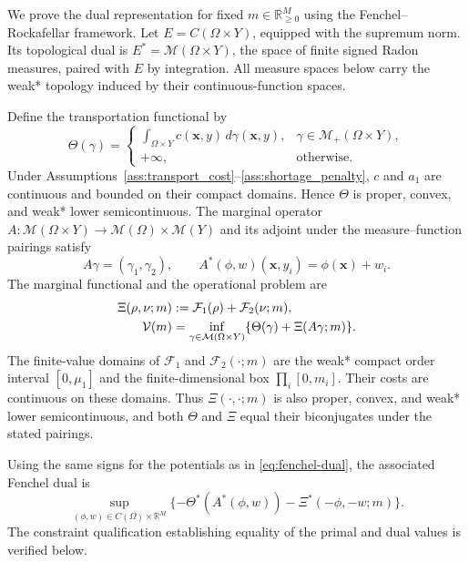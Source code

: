 \documentclass[a4paper,fleqn]{cas-sc}
\theoremstyle{remark}
\theoremstyle{plain}
\begin{document}
We prove the dual representation for fixed $m\in\mathbb R_{\ge0}^M$ using the Fenchel--Rockafellar framework. Let $E=C(\Omega\times Y)$, equipped with the supremum norm. Its topological dual is $E^*=\mathcal M(\Omega\times Y)$, the space of finite signed Radon measures, paired with $E$ by integration. All measure spaces below carry the weak* topology induced by their continuous-function spaces.

Define the transportation functional by
\begin{equation}\label{eq:app-transport-functional}
    \Theta(\gamma)=
    \begin{cases}
        \displaystyle\int_{\Omega\times Y}c(\bm x,y)\,d\gamma(\bm x,y),&\gamma\in\mathcal M_+(\Omega\times Y),\\
        +\infty,&\text{otherwise}.
    \end{cases}
\end{equation}
Under Assumptions~\ref{ass:transport_cost}--\ref{ass:shortage_penalty}, $c$ and $a_1$ are continuous and bounded on their compact domains. Hence $\Theta$ is proper, convex, and weak* lower semicontinuous. The marginal operator $A:\mathcal M(\Omega\times Y)\to\mathcal M(\Omega)\times\mathcal M(Y)$ and its adjoint under the measure--function pairings satisfy
\[
    A\gamma=(\gamma_1,\gamma_2),\qquad A^*(\phi,w)(\bm x,y_i)=\phi(\bm x)+w_i.
\]
The marginal functional and the operational problem are
\begin{subequations}\label{eq:app-primal-structure}
\allowdisplaybreaks[0]
\begin{align}
    \Xi(\rho,\nu;m)&:=\mathcal F_1(\rho)+\mathcal F_2(\nu;m),
        \label{eq:app-marginal-functional}\\
    \mathcal V(m)&=\inf_{\gamma\in\mathcal M(\Omega\times Y)}\{\Theta(\gamma)+\Xi(A\gamma;m)\}.
        \label{eq:app-operational-primal}
\end{align}
\end{subequations}
The finite-value domains of $\mathcal F_1$ and $\mathcal F_2(\cdot;m)$ are the weak* compact order interval $[0,\mu_1]$ and the finite-dimensional box $\prod_i[0,m_i]$. Their costs are continuous on these domains. Thus $\Xi(\cdot,\cdot;m)$ is also proper, convex, and weak* lower semicontinuous, and both $\Theta$ and $\Xi$ equal their biconjugates under the stated pairings.

Using the same signs for the potentials as in \eqref{eq:fenchel-dual}, the associated Fenchel dual is
\begin{equation}\label{eq:app-fenchel-dual}
    \sup_{(\phi,w)\in C(\Omega)\times\mathbb R^M}\{-\Theta^*(A^*(\phi,w))-\Xi^*(-\phi,-w;m)\}.
\end{equation}
The constraint qualification establishing equality of the primal and dual values is verified below.
\end{document}
